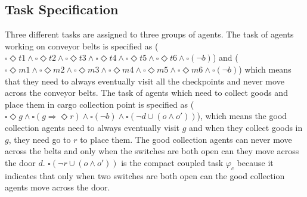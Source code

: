 \documentclass[journal]{IEEEtran}
\begin{document}
\subsection{Task Specification}
Three different tasks are assigned to three groups of agents. The task of agents working on conveyor belts is specified as ($\square\Diamond t1 \wedge \square\Diamond t2 \wedge \square\Diamond t3 \wedge \square\Diamond t4 \wedge \square\Diamond t5 \wedge \square\Diamond t6 \wedge \square(\neg b)$) and ($\square\Diamond m1 \wedge \square\Diamond m2 \wedge \square\Diamond m3 \wedge \square\Diamond m4 \wedge \square\Diamond m5 \wedge \square\Diamond m6 \wedge \square(\neg b)$) which means that they need to always eventually visit all the checkpoints and never move across the conveyor belts. The task of agents which need to collect goods and place them in cargo collection point is specified as ($\square\Diamond g \wedge \square(g\Longrightarrow \Diamond r) \wedge \square(\neg b) \wedge \square(\neg d \cup (o \wedge o'))$), which means the good collection agents need to always eventually visit $g$ and when they collect goods in $g$, they need go to $r$ to place them. The good collection agents can never move across the belts and only when the switches are both open can they move across the door $d$. $\square(\neg r \cup (o \wedge o'))$ is the compact coupled task $\varphi_c$ because it indicates that only when two switches are both open can the good collection agents move across the door.
\end{document}
